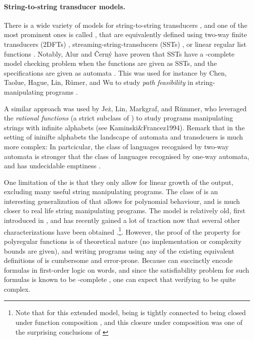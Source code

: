 \paragraph{String-to-string transducer models.} There is a wide variety of
models for string-to-string transducers \cite{MUSC19}, and one of the most
prominent ones is called , that are
equivalently defined using two-way finite transducers (2DFTs)
\cite{RASCO59}, streaming-string-transducers (SSTs) \cite{ALUR11}, or linear
regular list functions \cite{BDK18}. Notably, Alur and Černý have proven
that SSTs have a \PSPACE-complete model checking problem when the functions are
given as SSTs, and the specifications are given as automata
\cite[Theorem 13]{ALCE11}. This was used for instance by Chen, Taolue, Hague,
Lin, Rümer, and Wu to study \emph{path feasibility} in string-manipulating
programs \cite{CHLRW19}.

A similar approach was used by Jeż, Lin, Markgraf, and Rümmer,
who leveraged the \emph{rational functions} (a strict subclass of ) 
to study programs manipulating strings with infinite alphabets (see Kaminski&Francez1994). 
Remark that in the setting of ininifte alphabets the landscape of automata and transdcuers
is much more complex: In partcicular, the class of languages recognised by two-way automata is 
stronger that the class of languages recognised by one-way automata, and has undecidable emptiness
\cite[Figure 1.1]{BOJA19}.

\AP One limitation of the  is that they only 
allow for linear growth of the output, excluding many useful string manipulating 
programs. The class of  is an interesting 
generalization of  that allows for polynomial behaviour, 
and is much closer to real life string manipulating programs. The model 
is relatively old, first introduced in \cite{ENMA02},
and has recently gained a lot of traction now that
several other characterizations have been obtained
\cite{bojanczyk2018polyregular,bojanczyk2019string}.\footnote{Note that for this extended model, being
   is tightly connected to being closed under
function composition \cite[Proposition III.3]{FIRELH25}, and this closure under
composition was one of the surprising conclusions of
\cite{bojanczyk2018polyregular}}. However, the proof of the  property for polyregular functions is of theoretical nature (no
implementation or complexity bounds are given), and writing programs using any
of the existing equivalent definitions of  is
cumbersome and error-prone. Because  can succinctly
encode formulas in first-order logic on words, and
since the satisfiability problem for such formulas is known to be
\TOWER-complete \cite[Theorem 13.5]{REINH02}, one can expect that verifying
 to be quite complex.

